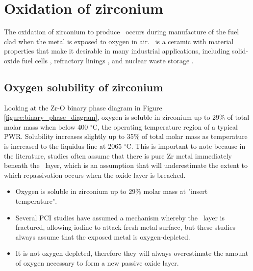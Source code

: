 \section{Oxidation of zirconium}

The oxidation of zirconium to produce \zirconia\ occurs during manufacture of the fuel clad when the metal is exposed to oxygen in air. \zirconia\ is a ceramic with material properties that make it desirable in many industrial applications, including solid-oxide fuel cells \cite{radford1979zirconia}, refractory linings \cite{whittemore1952fused}, and nuclear waste storage \cite{wang2012ceramics}.

\subsection{Oxygen solubility of zirconium}

Looking at the Zr-O binary phase diagram in Figure \ref{figure:binary_phase_diagram}, oxygen is soluble in zirconium up to 29\% of total molar mass when below 400 $^{\circ}$C, the operating temperature region of a typical PWR. Solubility increases slightly up to 35\% of total molar mass as temperature is increased to the liquidus line at 2065 $^{\circ}$C. This is important to note because in the literature, studies often assume that there is pure Zr metal immediately beneath the \zirconia\ layer, which is an assumption that will underestimate the extent to which repassivation occurs when the oxide layer is breached.

\begin{itemize}
\item Oxygen is soluble in zirconium up to 29\% molar mass at "insert temperature".
\item Several PCI studies have assumed a mechanism whereby the \zirconia\ layer is fractured, allowing iodine to attack fresh metal surface, but these studies always assume that the exposed metal is oxygen-depleted.
\item It is not oxygen depleted, therefore they will always overestimate the amount of oxygen necessary to form a new passive oxide layer.
\end{itemize}

